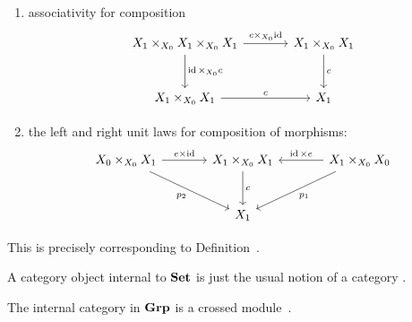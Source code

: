 \begin{node}
\begin{definition}
\begin{enumerate}
\item associativity for composition
\begin{equation*}
\begin{tikzcd}[sep=large]
X_{1}\times_{X_{0}}X_{1}\times_{X_{0}}X_{1}\ar[r,"c\times_{X_{0}}\id"]\ar[d,"\id\times_{X_{0}}c"]&X_{1}\times_{X_{0}}X_{1}\ar[d,"c"]\\
  X_{1}\times_{X_{0}}X_{1}\ar[r,"c"] & X_{1}
\end{tikzcd}
\end{equation*}
\item the left and right unit laws for composition of morphisms:
\begin{equation*}
\begin{tikzcd}[sep=large]
X_{0}\times_{X_{0}} X_{1}\ar[r,"e\times\id"]\ar[dr,swap,"p_{2}"] & X_{1}\times_{X_{0}} X_{1}\ar[d,"c"] & \ar[l,swap,"\id\times e"] X_{1}\times_{X_{0}}X_{0}\ar[dl,"p_{1}"]\\
& X_{1} & 
\end{tikzcd}
\end{equation*}
\end{enumerate}
This is precisely corresponding to Definition~.

\begin{node}[Examples]\label{internal-0001}%
A category object internal to $\mathbf{Set}$ is just the usual notion of a
category .
\end{node}

\begin{node}\label{cat:internal-000N}%
The internal category in $\mathbf{Grp}$ is a crossed module~\cite{pirashvili2024internal}.
\end{node}
\end{definition}


\end{node}
